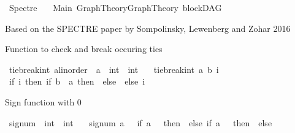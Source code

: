 %
\begin{isabellebody}%
%
%
\isadelimtheory
\isanewline
\isanewline
%
\endisadelimtheory
%
\isatagtheory
{}\isamarkupfalse%
\ Spectre\isanewline
\ \ \ Main\ Graph{\isacharunderscore}{\kern0pt}Theory{\isachardot}{\kern0pt}Graph{\isacharunderscore}{\kern0pt}Theory\ blockDAG\ \isanewline
{}%
\endisatagtheory
{\isafoldtheory}%
%
\isadelimtheory
%
\endisadelimtheory
%
\begin{isamarkuptext}%
Based on the SPECTRE paper by Sompolinsky, Lewenberg and Zohar 2016%
\end{isamarkuptext}\isamarkuptrue%
%
\isadelimdocument
%
\endisadelimdocument
%
\isatagdocument
%
\isamarkuptrue%
%
\isamarkuptrue%
%
\endisatagdocument
{\isafolddocument}%
%
\isadelimdocument
%
\endisadelimdocument
%
\begin{isamarkuptext}%
Function to check and break occuring ties%
\end{isamarkuptext}\isamarkuptrue%
\isamarkupfalse%
\ tie{\isacharunderscore}{\kern0pt}break{\isacharunderscore}{\kern0pt}int{\isacharcolon}{\kern0pt}{\isacharcolon}{\kern0pt}\ {\isachardoublequoteopen}{\isacharprime}{\kern0pt}a{\isacharcolon}{\kern0pt}{\isacharcolon}{\kern0pt}linorder\ {\isasymRightarrow}\ {\isacharprime}{\kern0pt}a\ {\isasymRightarrow}\ int\ {\isasymRightarrow}\ int{\isachardoublequoteclose}\isanewline
\ \ \ {\isachardoublequoteopen}tie{\isacharunderscore}{\kern0pt}break{\isacharunderscore}{\kern0pt}int\ a\ b\ i\ {\isacharequal}{\kern0pt}\isanewline
\ {\isacharparenleft}{\kern0pt}if\ i{\isacharequal}{\kern0pt}{}\ then\ {\isacharparenleft}{\kern0pt}if\ {\isacharparenleft}{\kern0pt}b\ {\isacharless}{\kern0pt}\ a{\isacharparenright}{\kern0pt}\ then\ {\isacharminus}{\kern0pt}{}\ else\ {}{\isacharparenright}{\kern0pt}\ else\ i{\isacharparenright}{\kern0pt}{\isachardoublequoteclose}%
\begin{isamarkuptext}%
Sign function with 0%
\end{isamarkuptext}\isamarkuptrue%
\isamarkupfalse%
\ signum\ {\isacharcolon}{\kern0pt}{\isacharcolon}{\kern0pt}\ {\isachardoublequoteopen}int\ {\isasymRightarrow}\ int{\isachardoublequoteclose}\isanewline
\ \ \ {\isachardoublequoteopen}signum\ a\ {\isacharequal}{\kern0pt}\ \ {\isacharparenleft}{\kern0pt}if\ a\ {\isachargreater}{\kern0pt}\ {}\ then\ {}\ else\ if\ a\ {\isacharless}{\kern0pt}\ {}\ then\ {\isacharminus}{\kern0pt}{}\ else\ {}{\isacharparenright}{\kern0pt}{\isachardoublequoteclose}%

\end{isabellebody}
